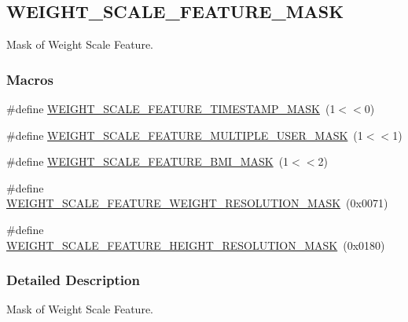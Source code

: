 \hypertarget{group___w_e_i_g_h_t___s_c_a_l_e___f_e_a_t_u_r_e___m_a_s_k}{}\subsection{W\+E\+I\+G\+H\+T\+\_\+\+S\+C\+A\+L\+E\+\_\+\+F\+E\+A\+T\+U\+R\+E\+\_\+\+M\+A\+SK}
\label{group___w_e_i_g_h_t___s_c_a_l_e___f_e_a_t_u_r_e___m_a_s_k}


Mask of Weight Scale Feature.  


\subsubsection*{Macros}
\begin{DoxyCompactItemize}
\item 
\#define \hyperlink{group___w_e_i_g_h_t___s_c_a_l_e___f_e_a_t_u_r_e___m_a_s_k_gafb766535cad9337b79bcbeee44772560}{W\+E\+I\+G\+H\+T\+\_\+\+S\+C\+A\+L\+E\+\_\+\+F\+E\+A\+T\+U\+R\+E\+\_\+\+T\+I\+M\+E\+S\+T\+A\+M\+P\+\_\+\+M\+A\+SK}~(1$<$$<$0)
\item 
\#define \hyperlink{group___w_e_i_g_h_t___s_c_a_l_e___f_e_a_t_u_r_e___m_a_s_k_gafe19689ea849b22f094123f895a9656a}{W\+E\+I\+G\+H\+T\+\_\+\+S\+C\+A\+L\+E\+\_\+\+F\+E\+A\+T\+U\+R\+E\+\_\+\+M\+U\+L\+T\+I\+P\+L\+E\+\_\+\+U\+S\+E\+R\+\_\+\+M\+A\+SK}~(1$<$$<$1)
\item 
\#define \hyperlink{group___w_e_i_g_h_t___s_c_a_l_e___f_e_a_t_u_r_e___m_a_s_k_gac97d3d6367d01bb5a1d44c80b6e8a30d}{W\+E\+I\+G\+H\+T\+\_\+\+S\+C\+A\+L\+E\+\_\+\+F\+E\+A\+T\+U\+R\+E\+\_\+\+B\+M\+I\+\_\+\+M\+A\+SK}~(1$<$$<$2)
\item 
\#define \hyperlink{group___w_e_i_g_h_t___s_c_a_l_e___f_e_a_t_u_r_e___m_a_s_k_ga6583718be6e93fe78379e48b460c1932}{W\+E\+I\+G\+H\+T\+\_\+\+S\+C\+A\+L\+E\+\_\+\+F\+E\+A\+T\+U\+R\+E\+\_\+\+W\+E\+I\+G\+H\+T\+\_\+\+R\+E\+S\+O\+L\+U\+T\+I\+O\+N\+\_\+\+M\+A\+SK}~(0x0071)
\item 
\#define \hyperlink{group___w_e_i_g_h_t___s_c_a_l_e___f_e_a_t_u_r_e___m_a_s_k_ga6d30207aeaeab2ebfaba17ca9d27d499}{W\+E\+I\+G\+H\+T\+\_\+\+S\+C\+A\+L\+E\+\_\+\+F\+E\+A\+T\+U\+R\+E\+\_\+\+H\+E\+I\+G\+H\+T\+\_\+\+R\+E\+S\+O\+L\+U\+T\+I\+O\+N\+\_\+\+M\+A\+SK}~(0x0180)
\end{DoxyCompactItemize}


\subsubsection{Detailed Description}
Mask of Weight Scale Feature. 



